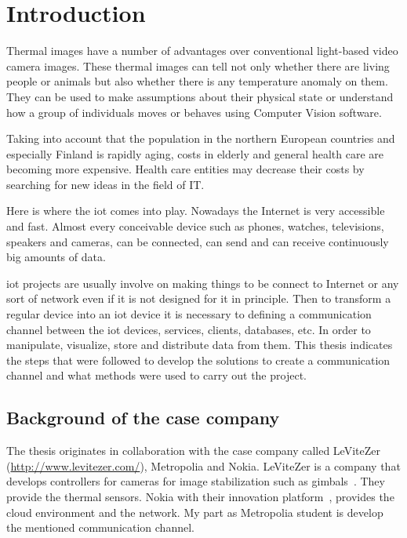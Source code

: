 \documentclass[hidelinks,11pt,a4paper,oneside,article]{memoir}
\begin{document}
\setcounter{page}{1} %
\ClearWallPaper

\sloppy %

\chapter{Introduction}\label{sec:introduction}


Thermal images have a number of advantages over conventional light-based video camera images.   These thermal images can tell not only whether there are living people or animals but also whether there is any temperature anomaly on them. They can be used to make assumptions about their physical state or understand how a group of individuals moves or behaves using Computer Vision software.

Taking into account that the population in the northern European countries and especially Finland is rapidly aging, costs in elderly and general health care are becoming more expensive. Health care entities may decrease their costs by searching for new ideas in the field of IT.

Here is where the \gls{iot} comes into play. Nowadays the Internet is very accessible and fast. Almost every conceivable device such as phones, watches, televisions, speakers and cameras, can be connected, can send and can receive continuously big amounts of data.

\gls{iot} projects are usually involve on making things to be connect to Internet or any sort of network even if it is not designed for it in principle. Then to transform a regular device into an \gls{iot} device it is necessary to defining a communication channel between the \gls{iot} devices, services, clients, databases, etc. In order to manipulate, visualize, store and distribute data from them. This thesis indicates the steps that were followed to develop the solutions to create a communication channel and what methods were used to carry out the project.


\section*{Background of the case company}
The thesis originates in collaboration with the case company called LeViteZer (\url{http://www.levitezer.com/}), Metropolia and Nokia.
 LeViteZer is a company that develops controllers for cameras for image stabilization such as gimbals~\cite{levitezer}. They provide the thermal sensors. Nokia with their innovation platform~\cite{nokiainnovation}, provides the cloud environment and the network. My part as Metropolia student is develop the mentioned communication channel.
\end{document}
